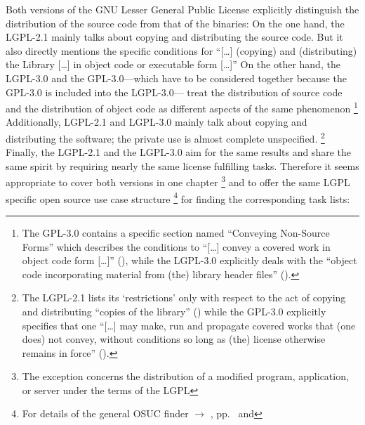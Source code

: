 Both versions of the GNU Lesser General Public License explicitly distinguish
the distribution of the source code from that of the binaries: On the one hand,
the LGPL-2.1 mainly talks about copying and distributing the source
code. But it also directly mentions the specific
conditions for \enquote{[\ldots] (copying) and (distributing) the Library
[\ldots] in object code or executable form [\ldots]} On the other
hand, the LGPL-3.0 and the GPL-3.0---which have to be considered together
because the GPL-3.0 is included into the LGPL-3.0--- treat the distribution of source code and the distribution of object
code as different aspects of the same phenomenon%
  \footnote{The GPL-3.0 contains a specific section named 
    \enquote{Conveying Non-Source Forms} which describes the conditions to
    \enquote{[\ldots] convey a covered work in object code form [\ldots]}
    (\cite[cf.][\nopage wp.\ §6]{Gpl30OsiLicense2007a}), while the LGPL-3.0
    explicitly deals with the 
    \enquote{object code incorporating material from (the) library header files}
    (\cite[cf.][\nopage wp.\ §3]{Lgpl30OsiLicense2007a}).}
Additionally, LGPL-2.1 and LGPL-3.0 mainly talk about copying and distributing
the software; the private use is almost complete unspecified.%
  \footnote{The LGPL-2.1 lists its `restrictions' only with respect to the act
    of copying and distributing \enquote{copies of the library} 
    (\cite[cf.][\nopage wp.\ §1, §2, §4 et passim]{Lgpl21OsiLicense1999a}) 
    while the GPL-3.0 explicitly specifies that one \enquote{[\ldots] may make,
    run and propagate covered works that (one does) not convey, without
    conditions so long as (the) license otherwise remains in force} 
    (\cite[cf.][\nopage wp.\ §2]{Gpl30OsiLicense2007a}).}
Finally, the LGPL-2.1 and the LGPL-3.0 aim for the same results and share the
same spirit by requiring nearly the same license fulfilling tasks. Therefore it
seems appropriate to cover both versions in one chapter%
  \footnote{The exception concerns the distribution of a modified program,
    application, or server under the terms of the LGPL} 
and to offer the same LGPL specific open source use case structure%
  \footnote{For details of the general OSUC finder $\rightarrow$ \oslic,
    pp.\ \pageref{OsucTokens} and \pageref{OsucDefinitionTree}} 
for finding the corresponding task lists: 
 


